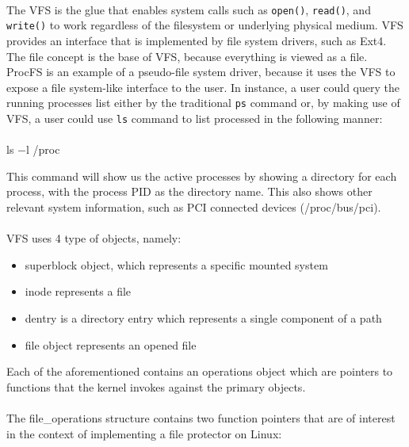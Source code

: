 	\paragraph{}
	The VFS is the glue that enables system calls such as \texttt{open()}, \texttt{read()}, and \texttt{write()} to work regardless of the filesystem or underlying physical medium\cite{LinuxKernelDevelopment}. VFS provides an interface that is implemented by file system drivers, such as Ext4. The file concept is the base of VFS, because everything is viewed as a file. ProcFS is an example of a pseudo-file system driver, because it uses the VFS to expose a file system-like interface to the user. In instance, a user could query the running processes list either by the traditional \texttt{ps} command or, by making use of VFS, a user could use \texttt{ls} command to list processed in the following manner:
	
	\paragraph{}
	\bigskip
	\centerline{ls $-$l /proc}
	\bigskip
	
	This command will show us the active processes by showing a directory for each process, with the process PID as the directory name. This also shows other relevant system information, such as PCI connected devices (/proc/bus/pci).
	
	\paragraph{}
	VFS uses 4 type of objects, namely:
	
	\begin{itemize}
		\item superblock object, which represents a specific mounted system
		\item inode represents a file 
		\item dentry is a directory entry which represents a single component of a path
		\item file object represents an opened file
	\end{itemize}
	
	Each of the aforementioned contains an operations object which are pointers to functions that the kernel invokes against the primary objects.
	
	\paragraph{}
	The file\_operations structure contains two function pointers that are of interest in the context of implementing a file protector on Linux: \\
	
